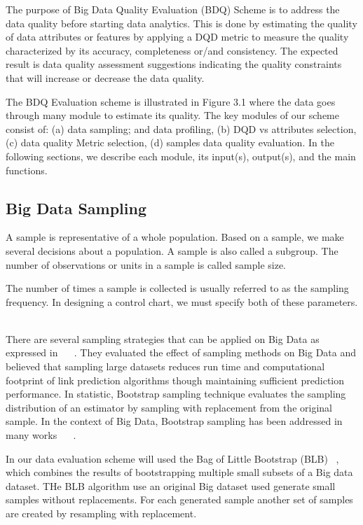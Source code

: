 The purpose of Big Data Quality Evaluation (BDQ) Scheme is to address the data quality before starting data analytics. This is done by estimating the quality of data attributes or features by applying a DQD metric to measure the quality characterized by its
accuracy, completeness or/and consistency. The expected result is data quality assessment suggestions indicating the quality 
constraints that will increase or decrease the data quality.

The BDQ Evaluation scheme is illustrated in Figure 3.1 where the data goes through many module to estimate its quality.
The key modules of our scheme consist of: (a) data sampling; and data profiling, (b) DQD vs attributes selection, 
(c) data quality Metric selection, (d) samples data quality evaluation. In the following sections, we describe each module, its input(s), output(s),
and the main functions.

\subsection{Big Data Sampling}

A sample is representative of a whole population. Based on a sample, we make several decisions about a population. 
A sample is also called a subgroup. The number of observations or units in a sample is called sample size. 

The number of times a sample is collected is usually referred to as the sampling frequency. In designing a control chart, we must specify both of these parameters. ~\cite{Jugulum14}

There are several sampling strategies that can be applied on Big Data as expressed in ~\cite{Asilomar} ~\cite{SIGKDD}.
They evaluated the effect of sampling methods on Big Data and believed that sampling large datasets reduces run time and computational footprint of link prediction algorithms though maintaining sufficient prediction performance. In statistic, Bootstrap sampling technique evaluates the sampling distribution of an estimator by sampling with replacement from the original sample. In the context of Big Data, Bootstrap sampling has been addressed in many works  ~\cite{Liang2016} ~\cite{Satyanarayana2014}. 

In our data evaluation scheme will used the Bag of Little Bootstrap (BLB) ~\cite{ArXiv12066415}, which combines the results of bootstrapping multiple small subsets of a Big data dataset. THe BLB algorithm use an original Big dataset used generate small samples without replacements. For each generated sample another set of samples are created by resampling with replacement.

